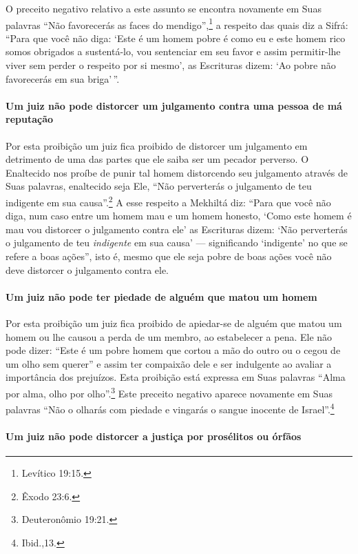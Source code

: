 O preceito negativo relativo a este assunto se encontra novamente em
Suas palavras ``Não favorecerás as faces do mendigo'',\footnote{Levítico 19:15.}
a respeito das quais diz a Sifrá: ``Para que você não diga: `Este é um
homem pobre é como eu e este homem rico somos obrigados a sustentá-lo,
vou sentenciar em seu favor e assim permitir-lhe viver sem perder o
respeito por si mesmo', as Escrituras dizem: `Ao pobre não favorecerás
em sua briga'\,''.

\paragraph{Um juiz não pode distorcer um julgamento contra uma pessoa de má reputação}

Por esta proibição um juiz fica proibido de distorcer um julgamento em
detrimento de uma das partes que ele saiba ser um pecador perverso. O
Enaltecido nos proíbe de punir tal homem distorcendo seu julgamento
através de Suas palavras, enaltecido seja Ele, ``Não perverterás o
julgamento de teu indigente em sua causa''.\footnote{Êxodo 23:6.} A esse
respeito a Mekhiltá diz: ``Para que você não diga, num caso entre um
homem mau e um homem honesto, `Como este homem é mau vou distorcer o
julgamento contra ele' as Escrituras dizem: `Não perverterás o
julgamento de teu \emph{indigente} em sua causa' --- significando
`indigente' no que se refere a boas ações'', isto é, mesmo que ele seja
pobre de boas ações você não deve distorcer o julgamento contra ele.

\paragraph{Um juiz não pode ter piedade de alguém que matou um homem}

Por esta proibição um juiz fica proibido de apiedar-se de alguém que
matou um homem ou lhe causou a perda de um membro, ao estabelecer a
pena. Ele não pode dizer: ``Este é um pobre homem que cortou a mão do
outro ou o cegou de um olho sem querer'' e assim ter compaixão dele e
ser indulgente ao avaliar a importância dos prejuízos. Esta proibição
está expressa em Suas palavras ``Alma por alma, olho por olho''.\footnote{Deuteronômio 19:21.} Este preceito negativo aparece novamente em Suas
palavras ``Não o olharás com piedade e vingarás o sangue inocente de
Israel''.\footnote{Ibid.,13.}

\paragraph{Um juiz não pode distorcer a justiça por prosélitos ou órfãos}

